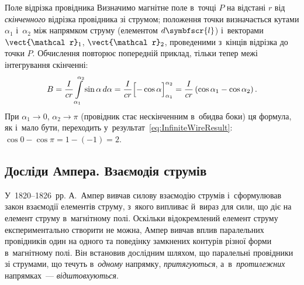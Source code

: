 \begin{Example}{Поле відрізка провідника}
	Визначимо магнітне поле в~точці $P$ на відстані $r$ від \emph{скінченного} відрізка
	провідника зі струмом; положення точки визначається кутами $\alpha_1$ і~$\alpha_2$ між
	напрямком струму (елементом $d\symbfscr{l}$) і~векторами $\vect{\mathcal r}_1$,
	$\vect{\mathcal r}_2$, проведеними з~кінців відрізка до точки $P$.
	Обчислення повторює попередній приклад, тільки тепер межі інтегрування скінченні:
	\begin{equation*}
		B = \frac{I}{cr}\int\limits_{\alpha_1}^{\alpha_2} \sin\alpha\, d\alpha
		= \frac{I}{cr}\Bigl[-\cos\alpha\Bigr]_{\alpha_1}^{\alpha_2}
		= \frac{I}{cr}\left(\cos\alpha_1 - \cos\alpha_2\right).
	\end{equation*}
	При $\alpha_1 \to 0$, $\alpha_2 \to \pi$ (провідник стає нескінченним в~обидва боки)
	ця формула, як і~мало бути, переходить у~результат~\eqref{eq:InfiniteWireResult}:
	$\cos 0 - \cos\pi = 1 - (-1) = 2$.
	\begin{center}
	\end{center}
\end{Example}


\subsection*{Досліди Ампера. Взаємодія струмів}


У~1820--1826~рр. А.~Ампер вивчав силову взаємодію струмів і~сформулював закон взаємодії
елементів струму, з~якого випливає й~вираз для сили, що діє на елемент струму в~магнітному
полі. Оскільки відокремлений елемент струму експериментально створити не можна, Ампер
вивчав вплив паралельних провідників один на одного та поведінку замкнених контурів різної
форми в~магнітному полі. Він встановив дослідним шляхом, що паралельні провідники зі
струмами, що течуть в~\emph{одному} напрямку, \emph{притягуються},
а~в~\emph{протилежних} напрямках~--- \emph{відштовхуються}.



